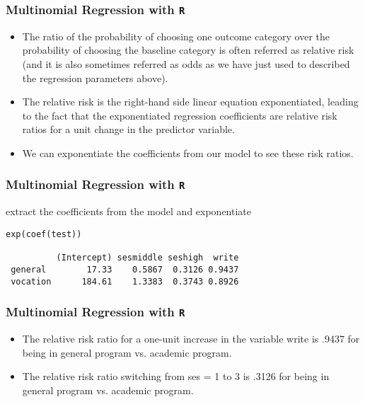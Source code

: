 \documentclass[00-GLMregslides.tex]{subfiles}
\begin{document}
	


\begin{frame}[fragile]

\frametitle{Multinomial Regression with \texttt{R}}
\Large
\begin{itemize}
\item The ratio of the probability of choosing one outcome category over the probability of choosing the baseline category is often referred as 
relative risk (and it is also sometimes referred as odds as we have just used to described the regression parameters above). 
\item  The relative risk is the right-hand side linear equation exponentiated, leading to the fact that the 
exponentiated regression coefficients are relative risk ratios for a unit change in the predictor variable. 
\item  We can exponentiate the coefficients from our model to see these risk ratios. 
\end{itemize}
\end{frame}
\begin{frame}[fragile]

\frametitle{Multinomial Regression with \texttt{R}}
\Large

extract the coefficients from the model and exponentiate
\begin{framed}
\begin{verbatim}
exp(coef(test))
 
          (Intercept) sesmiddle seshigh  write
 general        17.33    0.5867  0.3126 0.9437
 vocation      184.61    1.3383  0.3743 0.8926
\end{verbatim}
\end{framed}
\end{frame}
\begin{frame}[fragile]

\frametitle{Multinomial Regression with \texttt{R}}
\Large
\begin{itemize}
\item The relative risk ratio for a one-unit increase in the variable write is .9437 for being in general program vs. academic program. 
\item The relative risk ratio switching from ses = 1 to 3 is .3126 for being in general program vs. academic program. 
\end{itemize}
\end{frame}
\end{document}
